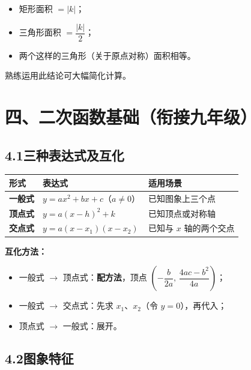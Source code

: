 \documentclass[12pt, a4paper]{ctexart}
\begin{document}
\begin{tipbox}[反比例函数面积问题核心公式]
\begin{itemize}
  \item 矩形面积 $=|k|$；
  \item 三角形面积 $=\dfrac{|k|}{2}$；
  \item 两个这样的三角形（关于原点对称）面积相等。
\end{itemize}
熟练运用此结论可大幅简化计算。
\end{tipbox}

\newpage

\section*{\textcolor{mainblue}{四、二次函数基础（衔接九年级）}}

\subsection*{4.1\quad 三种表达式及互化}

\begin{knowledgebox}[二次函数的三种形式]
\renewcommand{\arraystretch}{1.6}
\begin{center}
\begin{tabular}{>{\bfseries}l l l}
\toprule
形式 & 表达式 & 适用场景 \\
\midrule
一般式 & $y=ax^2+bx+c$（$a\ne 0$） & 已知图象上三个点 \\
顶点式 & $y=a(x-h)^2+k$ & 已知顶点或对称轴 \\
交点式 & $y=a(x-x_1)(x-x_2)$ & 已知与 $x$ 轴的两个交点 \\
\bottomrule
\end{tabular}
\end{center}

\textbf{互化方法：}
\begin{itemize}
  \item 一般式 $\to$ 顶点式：\textbf{配方法}，顶点 $\left(-\dfrac{b}{2a},\,\dfrac{4ac-b^2}{4a}\right)$；
  \item 一般式 $\to$ 交点式：先求 $x_1$、$x_2$（令 $y=0$），再代入；
  \item 顶点式 $\to$ 一般式：展开。
\end{itemize}
\end{knowledgebox}

\subsection*{4.2\quad 图象特征}
\end{document}
